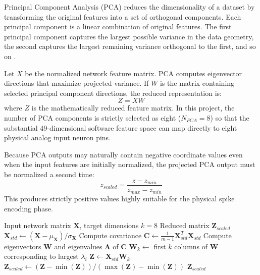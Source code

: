 \documentclass{ieeeaccess}
\newcommand{\Require}{\REQUIRE}
\newcommand{\Ensure}{\ENSURE}
\newcommand{\State}{\STATE}
\newcommand{\Return}{\RETURN}
\begin{document}
Principal Component Analysis (PCA) reduces the dimensionality of a dataset by transforming the original features into a set of orthogonal components. Each principal component is a linear combination of original features. The first principal component captures the largest possible variance in the data geometry, the second captures the largest remaining variance orthogonal to the first, and so on \cite{Jolliffe2016}.

Let $X$ be the normalized network feature matrix. PCA computes eigenvector directions that maximize projected variance. If $W$ is the matrix containing selected principal component directions, the reduced representation is:
\begin{equation}
Z = XW
\end{equation}
where $Z$ is the mathematically reduced feature matrix. In this project, the number of PCA components is strictly selected as eight ($N_{PCA}=8$) so that the substantial 49-dimensional software feature space can map directly to eight physical analog input neuron pins.

Because PCA outputs may naturally contain negative coordinate values even when the input features are initially normalized, the projected PCA output must be normalized a second time:
\begin{equation}
z_{scaled} = \frac{z - z_{min}}{z_{max} - z_{min}}
\end{equation}
This produces strictly positive values highly suitable for the physical spike encoding phase.

\begin{algorithm}
\caption{PCA-based Dimensionality Reduction}\label{alg:pca}
\begin{algorithmic}[1]
\Require Input network matrix $\mathbf{X}$, target dimensions $k=8$
\Ensure Reduced matrix $\mathbf{Z}_{scaled}$
\State $\mathbf{X}_{std} \gets (\mathbf{X} - \mu_{\mathbf{X}}) / \sigma_{\mathbf{X}}$
\State Compute covariance $\mathbf{C} \gets \frac{1}{m-1} \mathbf{X}_{std}^T \mathbf{X}_{std}$
\State Compute eigenvectors $\mathbf{W}$ and eigenvalues $\mathbf{\Lambda}$ of $\mathbf{C}$
\State $\mathbf{W}_k \gets$ first $k$ columns of $\mathbf{W}$ corresponding to largest $\lambda_i$
\State $\mathbf{Z} \gets \mathbf{X}_{std}\mathbf{W}_k$
\State $\mathbf{Z}_{scaled} \gets (\mathbf{Z} - \min(\mathbf{Z})) / (\max(\mathbf{Z}) - \min(\mathbf{Z}))$
\State \Return $\mathbf{Z}_{scaled}$
\end{algorithmic}
\end{algorithm}
\end{document}
